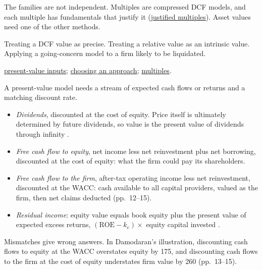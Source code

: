 \begin{qfdefinition}
 The families are not independent. Multiples are compressed DCF models, and each multiple has fundamentals that justify it (\hyperref[meth:justified-multiples]{justified multiples}). Asset values need one of the other methods.

 Treating a DCF value as precise. Treating a relative value as an intrinsic value. Applying a going-concern model to a firm likely to be liquidated.

 \hyperref[meth:present-value-model-inputs]{present-value inputs}; \hyperref[meth:valuation-approach-choice]{choosing an approach}; \hyperref[meth:multiples-valuation-basics]{multiples}.

\end{qfdefinition}

\begin{qfmethod}\label{meth:present-value-model-inputs}
 A present-value model needs a stream of expected cash flows or returns and a matching discount rate.
\begin{itemize}
\item \emph{Dividends}, discounted at the cost of equity. Price itself is ultimately determined by future dividends, so value is the present value of dividends through infinity \citep[p.~323]{investment-valuation-2012}.
\item \emph{Free cash flow to equity}, net income less net reinvestment plus net borrowing, discounted at the cost of equity: what the firm could pay its shareholders.
\item \emph{Free cash flow to the firm}, after-tax operating income less net reinvestment, discounted at the WACC: cash available to all capital providers, valued as the firm, then net claims deducted (pp.~12--15).
\item \emph{Residual income}: equity value equals book equity plus the present value of expected excess returns, $(\mathrm{ROE}-k_e)\times$ equity capital invested \citep[pp.~596--597]{investment-valuation-2012}.
\end{itemize}

Mismatches give wrong answers. In Damodaran's illustration, discounting cash flows to equity at the WACC overstates equity by 175, and discounting cash flows to the firm at the cost of equity understates firm value by 260 (pp.~13--15).


\end{qfmethod}
